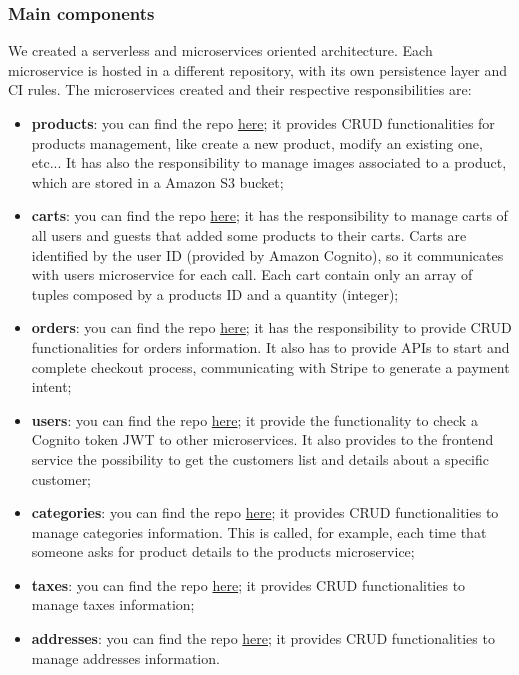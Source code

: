 \subsubsection{Main components}
We created a serverless and microservices oriented architecture. Each microservice is hosted in a different repository, with its own persistence layer and CI rules.
The microservices created and their respective responsibilities are:
\begin{itemize}
    \item \textbf{products}: you can find the repo \href{https://github.com/SWException/products}{here}; it provides CRUD functionalities for products management,
          like create a new product, modify an existing one, etc... It has also the responsibility to manage images associated to a product, which are
          stored in a Amazon S3 bucket;
    \item \textbf{carts}: you can find the repo \href{https://github.com/SWException/carts}{here}; it has the responsibility to manage carts of all users and guests that
          added some products to their carts. Carts are identified by the user ID (provided by Amazon Cognito), so it communicates with users microservice for each call.
          Each cart contain only an array of tuples composed by a products ID and a quantity (integer);
    \item \textbf{orders}: you can find the repo \href{https://github.com/SWException/orders}{here}; it has the responsibility to provide CRUD functionalities for orders information.
          It also has to provide APIs to start and complete checkout process, communicating with Stripe to generate a payment intent;
    \item \textbf{users}: you can find the repo \href{https://github.com/SWException/users}{here}; it provide the functionality to check a Cognito token JWT to other microservices.
          It also provides to the frontend service the possibility to get the customers list and details about a specific customer;
    \item \textbf{categories}: you can find the repo \href{https://github.com/SWException/categories}{here}; it provides CRUD functionalities to manage categories information.
          This is called, for example, each time that someone asks for product details to the products microservice;
    \item \textbf{taxes}: you can find the repo \href{https://github.com/SWException/taxes}{here}; it provides CRUD functionalities to manage taxes information;
    \item \textbf{addresses}: you can find the repo \href{https://github.com/SWException/addresses}{here}; it provides CRUD functionalities to manage addresses information.
\end{itemize}

